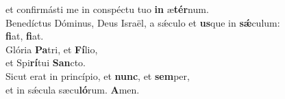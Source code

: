 \oddverse et confirmásti me in conspéctu tuo \textbf{in} æ\textbf{tér}num.\\
\evenverse Benedíctus Dóminus, Deus Israël, a sǽculo et \textbf{us}que in \textbf{sǽ}culum:~\*\\
\evenverse \textbf{fi}at, \textbf{fi}at.\\
\oddverse Glória \textbf{Pa}tri, et \textbf{Fí}lio,~\*\\
\oddverse et Spi\textbf{rí}tui \textbf{San}cto.\\
\evenverse Sicut erat in princípio, et \textbf{nunc}, et \textbf{sem}per,~\*\\
\evenverse et in sǽcula sæcu\textbf{ló}rum. \textbf{A}men.\\
